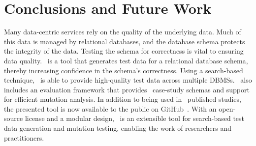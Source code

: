 \section{Conclusions and Future Work}\label{sec:conclusion}

Many data-centric services rely on the quality of the underlying data. Much of this data is managed by relational
databases, and the database schema protects the integrity of the data.  Testing the schema for correctness is vital to
ensuring data quality. \sa~is a tool that generates test data for a relational database schema, thereby increasing
confidence in the schema's correctness. Using a search-based technique, \sa~is able to provide high-quality test data
across multiple DBMSs. \sa~also includes an evaluation framework that provides \numprovidedschemas~case-study schemas
and support for efficient mutation analysis. In addition to being used in \numuniquepapers~published studies, the
presented tool is now available to the public on GitHub~\cite{tool}. With an open-source license and a modular design,
\sa~is an extensible tool for search-based test data generation and mutation testing, enabling the work of researchers
and practitioners.

